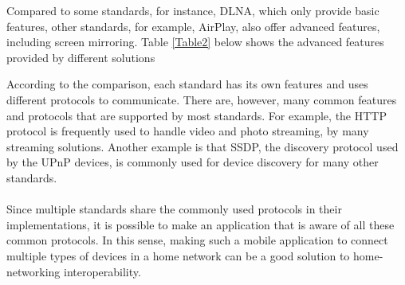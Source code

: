\begin{enumerate}
Compared to some standards, for instance, DLNA, which only provide basic features, other standards, for example, AirPlay, also offer advanced 
features, including screen mirroring. Table \ref{Table2} below shows 
the advanced features provided by different solutions
\begin{table}[htb] 
\caption{Advanced feature comparison \label{Table2}} 
\begin{center} 
\end{center} 
\end{table} 


\end{enumerate} 

According to the comparison, each standard has its own features and uses 
different protocols to communicate. There are, however, many common features and protocols that are supported by most standards. For example, the HTTP protocol is frequently used to handle video 
and photo streaming, by many streaming solutions. Another example is that SSDP, the discovery protocol used by the UPnP devices, is commonly used for device discovery for many other standards. \\
\\
Since multiple standards share the commonly used protocols in their implementations, it is possible to make an application that is aware of all these common protocols. In this sense, making such a mobile application to connect multiple types of devices in a home network can be a good solution to home-networking interoperability. 

